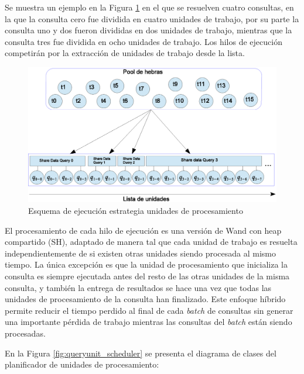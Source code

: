 Se muestra un ejemplo en la Figura \ref{fig:queryunit_execution} en el que se resuelven cuatro consultas, en la que la consulta cero fue dividida en cuatro unidades de trabajo, por su parte la consulta uno y dos fueron divididas en dos unidades de trabajo, mientras que la consulta tres fue dividida en ocho unidades de trabajo. Los hilos de ejecución competirán por la extracción de unidades de trabajo desde la lista.

\begin{figure}[!th]
\centering
\includegraphics[scale=.75]{images/QueryUnitExecution.eps}
\caption{Esquema de ejecución estrategia unidades de procesamiento}
\label{fig:queryunit_execution}
\end{figure}

El procesamiento de cada hilo de ejecución es una versión de Wand con heap compartido (SH), adaptado de manera tal que cada unidad de trabajo es resuelta independientemente de si existen otras unidades siendo procesada al mismo tiempo. La única excepción es que la unidad de procesamiento que inicializa la consulta es siempre ejecutada antes del resto de las otras unidades de la misma consulta, y también la entrega de resultados se hace una vez que todas las unidades de procesamiento de la consulta han finalizado. Este enfoque híbrido permite reducir el tiempo perdido al final de cada \textit{batch} de consultas sin generar una importante pérdida de trabajo mientras las consultas del \textit{batch} están siendo procesadas.

En la Figura \ref{fig:queryunit_scheduler} se presenta el diagrama de clases del planificador de unidades de procesamiento:

